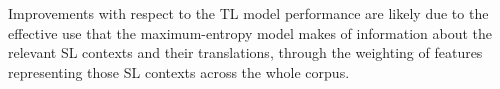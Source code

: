 \documentclass[11pt]{article}
\newcommand{\comment}[1]{\todo{#1}}
\begin{document}

 Improvements with respect to the TL model performance are likely due
 to the effective use that the maximum-entropy model makes of
 information about the relevant SL contexts and their translations,
 through the weighting of features representing those SL contexts
 across the whole corpus.

\end{document}
